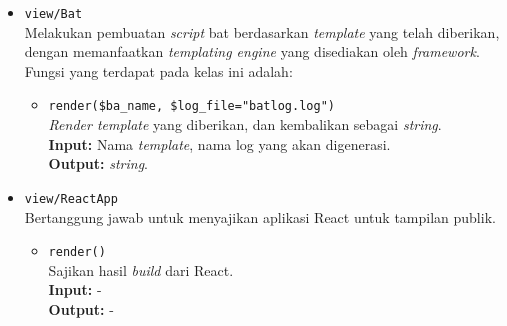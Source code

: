 \begin{itemize}
        \item \texttt{view/Bat} \\
            Melakukan pembuatan \textit{script} bat berdasarkan
            \textit{template} yang telah diberikan, dengan memanfaatkan
            \textit{templating engine} yang disediakan oleh \textit{framework}.
            Fungsi yang terdapat pada kelas ini adalah:
            \begin{itemize}
                \item \texttt{render(\$ba\_name, \$log\_file="batlog.log")} \\
                    \textit{Render template} yang diberikan, dan kembalikan
                    sebagai \textit{string}. \\
                    \textbf{Input:} Nama \textit{template}, nama log yang akan
                    digenerasi.\\
                    \textbf{Output:} \textit{string}.
            \end{itemize}
        
        \item \texttt{view/ReactApp} \\
            Bertanggung jawab untuk menyajikan aplikasi React untuk tampilan
            publik.
            \begin{itemize}
                \item \texttt{render()} \\
                    Sajikan hasil \textit{build} dari React. \\
                    \textbf{Input:} -\\
                    \textbf{Output:} -
            \end{itemize}
    \end{itemize}
    

